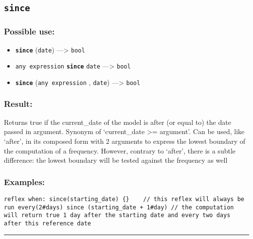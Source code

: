 \documentclass[]{book}
\providecommand{\tightlist}{%
  \setlength{\itemsep}{0pt}\setlength{\parskip}{0pt}}
\theoremstyle{definition}
\theoremstyle{definition}
\theoremstyle{definition}
\theoremstyle{remark}
\begin{document}
\subsection{\texorpdfstring{\texttt{since}}{since}}\label{since}

\subsubsection{Possible use:}\label{possible-use-478}

\begin{itemize}
\tightlist
\item
  \textbf{\texttt{since}} (\texttt{date}) ---\textgreater{}
  \texttt{bool}
\item
  \texttt{any\ expression} \textbf{\texttt{since}} \texttt{date}
  ---\textgreater{} \texttt{bool}
\item
  \textbf{\texttt{since}} (\texttt{any\ expression} , \texttt{date})
  ---\textgreater{} \texttt{bool}
\end{itemize}

\subsubsection{Result:}\label{result-462}

Returns true if the current\_date of the model is after (or equal to)
the date passed in argument. Synonym of `current\_date \textgreater{}=
argument'. Can be used, like `after', in its composed form with 2
arguments to express the lowest boundary of the computation of a
frequency. However, contrary to `after', there is a subtle difference:
the lowest boundary will be tested against the frequency as well

\subsubsection{Examples:}\label{examples-334}

\begin{verbatim}
reflex when: since(starting_date) {}    // this reflex will always be run every(2#days) since (starting_date + 1#day) // the computation will return true 1 day after the starting date and every two days after this reference date 
\end{verbatim}

\begin{center}\rule{0.5\linewidth}{\linethickness}\end{center}
\end{document}
